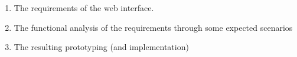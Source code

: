 \begin {enumerate}

\item
The requirements of the web interface.

\item
The functional analysis of the requirements through some expected scenarios

\item
The resulting prototyping (and implementation)  

\end {enumerate} 



 